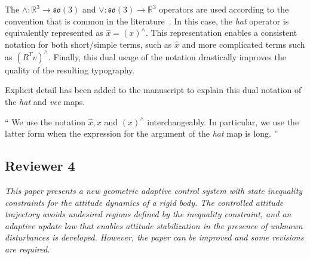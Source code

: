\documentclass[11pt]{article}
\newcommand{\parenth}[1]{\ensuremath{\left( #1 \right)}}
\newcommand{\so}{\ensuremath{\mathfrak{so}(3)}}
\newcommand{\R}{\ensuremath{\mathbb{R}}}
\newenvironment{correction}{\begin{list}{}{\setlength{\leftmargin}{1cm}\setlength{\rightmargin}{1cm}}\vspace{\parsep}\item[]``}{''\end{list}}
\begin{document}
\begin{enumerate}
The \( \wedge : \R^3 \to \so \) and \( \vee : \so \to \R^3 \) operators are used according to the convention that is common in the literature~\cite{lee2010,lee2011a}.
In this case, the \textit{hat} operator is equivalently represented as \( \hat{x} = \parenth{x}^\wedge \).
This representation enables a consistent notation for both short/simple terms, such as \( \hat{x} \) and more complicated terms such as \(\parenth{R^T v}^\wedge\). 
Finally, this dual usage of the notation drastically improves the quality of the resulting typography.

Explicit detail has been added to the manuscript to explain this dual notation of the \textit{hat} and \textit{vee} maps.
\begin{correction}
We use the notation \( \hat{x}, x\) and \( \parenth{x}^\wedge\) interchangeably.
In particular, we use the latter form when the expression for the argument of the \textit{hat} map is long. 
\end{correction}
\end{enumerate}

\subsection*{Reviewer 4}
\textit{This paper presents a new geometric adaptive control system with state inequality constraints for the attitude dynamics of a rigid body. The controlled attitude trajectory avoids undesired regions defined by the inequality constraint, and an adaptive update law that enables attitude stabilization in the presence of unknown disturbances is developed. However, the paper can be improved and some revisions are required.}
\end{document}
